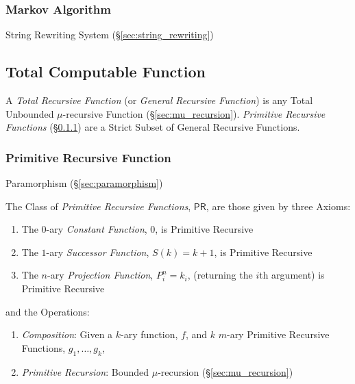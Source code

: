 \subsubsection{Markov Algorithm}\label{sec:markov_algorithm}

String Rewriting System (\S\ref{sec:string_rewriting})



\subsection{Total Computable Function}\label{sec:total_computable}

A \emph{Total Recursive Function} (or \emph{General Recursive
  Function}) is any Total Unbounded $\mu$-recursive Function
(\S\ref{sec:mu_recursion}). \emph{Primitive Recursive Functions}
(\S\ref{sec:primitive_recursive}) are a Strict Subset of General
Recursive Functions.



\subsubsection{Primitive Recursive Function}
\label{sec:primitive_recursive}

Paramorphism (\S\ref{sec:paramorphism})

The Class of \emph{Primitive Recursive Functions}, $\mathsf{PR}$, are
those given by three Axioms:
\begin{enumerate}
  \item The $0$-ary \emph{Constant Function}, $0$, is Primitive
    Recursive
  \item The $1$-ary \emph{Successor Function}, $S(k) = k + 1$, is
    Primitive Recursive
  \item The $n$-ary \emph{Projection Function}, $P_i^n = k_i$,
    (returning the $i$th argument) is Primitive Recursive
\end{enumerate}
and the Operations:
\begin{enumerate}
  \item \emph{Composition}: Given a $k$-ary function, $f$, and $k$
    $m$-ary Primitive Recursive Functions, $g_1, \ldots, g_k$,
  \item \emph{Primitive Recursion}: Bounded $\mu$-recursion
    (\S\ref{sec:mu_recursion})
\end{enumerate}

